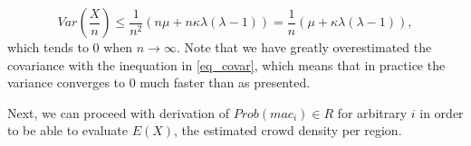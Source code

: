 \documentclass[10pt,a4paper]{article}
\begin{document}
\begin{equation}
Var(\frac{X}{n} ) \leq \frac{1}{n^2}(n \mu + n  \kappa \lambda(\lambda - 1)) = \frac{1}{n}(\mu +  \kappa \lambda(\lambda - 1)), 
\end{equation}
which tends to $0$ when $n \rightarrow \infty$. Note that we have greatly overestimated the covariance with the inequation in \eqref{eq_covar}, which means that in practice the variance converges to $0$ much faster than as presented. 

Next, we can proceed with derivation of $Prob(mac_i) \in R$ for arbitrary $i$ in order to be able to evaluate $E(X)$, the estimated crowd density per region. 
   

\end{document}
